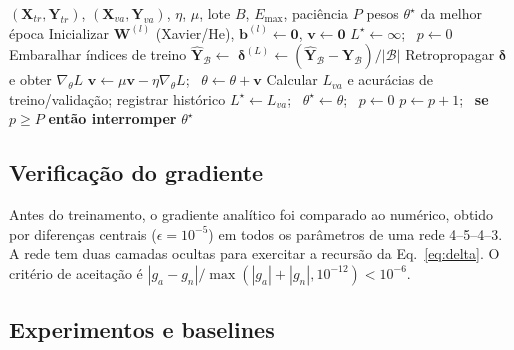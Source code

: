 \documentclass[12pt,a4paper]{article}
\begin{document}
\begin{algorithm}[H]
  \caption{Treinamento da MLP com mini-batch, momentum e parada antecipada}
  \label{alg:treino}
  \begin{algorithmic}[1]
    \Require $(\mathbf{X}_{tr},\mathbf{Y}_{tr})$, $(\mathbf{X}_{va},\mathbf{Y}_{va})$, $\eta$, $\mu$,
             lote $B$, $E_{\max}$, paciência $P$
    \Ensure pesos $\theta^\star$ da melhor época
    \State Inicializar $\mathbf{W}^{(l)}$ (Xavier/He), $\mathbf{b}^{(l)}\gets\mathbf{0}$, $\mathbf{v}\gets\mathbf{0}$
    \State $L^\star\gets\infty$; \ $p\gets 0$
      \State Embaralhar índices de treino
        \State $\hat{\mathbf{Y}}_{\mathcal{B}}\gets$  
        \State $\boldsymbol{\delta}^{(L)}\gets(\hat{\mathbf{Y}}_{\mathcal{B}}-\mathbf{Y}_{\mathcal{B}})/|\mathcal{B}|$ 
        \State Retropropagar $\boldsymbol{\delta}$ e obter $\nabla_\theta L$ 
        \State $\mathbf{v}\gets\mu\mathbf{v}-\eta\nabla_\theta L$; \ $\theta\gets\theta+\mathbf{v}$ 
      \EndFor
      \State Calcular $L_{va}$ e acurácias de treino/validação; registrar histórico
        \State $L^\star\gets L_{va}$; \ $\theta^\star\gets\theta$; \ $p\gets 0$
      \Else
        \State $p\gets p+1$; \ \textbf{se} $p\ge P$ \textbf{então interromper}
      \EndIf
    \EndFor
    \State \Return $\theta^\star$
  \end{algorithmic}
\end{algorithm}

\subsection{Verificação do gradiente}

Antes do treinamento, o gradiente analítico foi comparado ao numérico, obtido por diferenças centrais
($\epsilon=10^{-5}$) em todos os parâmetros de uma rede 4--5--4--3. A rede tem duas camadas ocultas
para exercitar a recursão da Eq.~\eqref{eq:delta}. O critério de aceitação é
$|g_a-g_n|/\max(|g_a|+|g_n|,10^{-12})<10^{-6}$.

\subsection{Experimentos e baselines}
\label{sec:experimentos}
\end{document}
